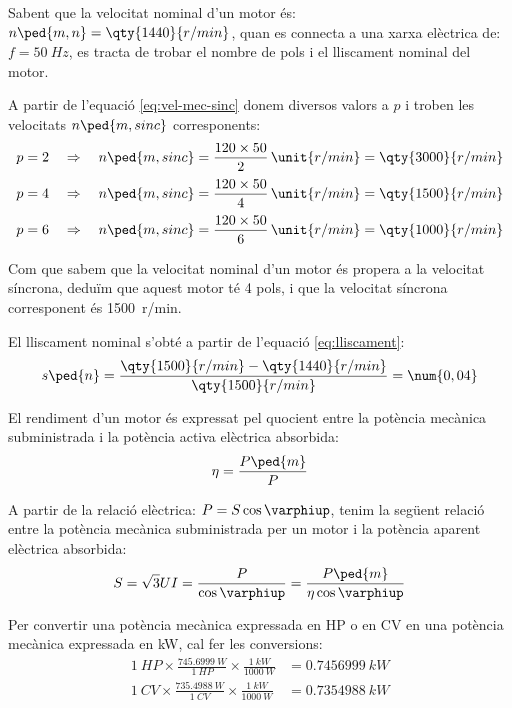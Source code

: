	
\begin{exemple}[\MotorNombrePols{}]
	\addcontentsxms{\MotorNombrePols}
    Sabent que la velocitat nominal d'un motor és: $n\ped{m,n} = \qty{1440}{r/min}$, quan es connecta a una xarxa elèctrica de: $f = \qty{50}{Hz}$,  es tracta de trobar el nombre de pols i el lliscament nominal del motor.

    A partir de l'equació \eqref{eq:vel-mec-sinc} donem diversos valors a $p$ i troben les velocitats $n\ped{m,sinc}$ corresponents:
    \begin{align*}
      p = 2 \quad  &\Rightarrow \quad n\ped{m,sinc} = \frac{120 \times 50}{2} \, \unit{r/min} = \qty{3000}{r/min}\\[0.5ex]
      p = 4 \quad  &\Rightarrow \quad n\ped{m,sinc} = \frac{120 \times 50}{4} \, \unit{r/min} = \qty{1500}{r/min}\\[0.5ex]
      p = 6 \quad  &\Rightarrow \quad n\ped{m,sinc} = \frac{120 \times 50}{6} \, \unit{r/min} = \qty{1000}{r/min}
    \end{align*}

    Com que sabem que la velocitat nominal d'un motor és propera a la velocitat síncrona, deduïm que aquest motor té 4 pols, i que la velocitat síncrona corresponent és \qty{1500}{r/min}.

    El lliscament nominal s'obté a partir de l'equació \eqref{eq:lliscament}:
    \[
      s\ped{n} = \frac{\qty{1500}{r/min} - \qty{1440}{r/min}}{\qty{1500}{r/min}} = \num{0,04}
    \]
\end{exemple}

El rendiment d'un motor és expressat pel quocient entre la potència mecànica subministrada i la potència activa elèctrica absorbida:
\begin{equation}\index{rendiment}\index{potència!mecànica}
    \eta = \frac{P\ped{m}}{P}
\end{equation}

A partir de la relació elèctrica: $P = S \cos\varphiup$, tenim la següent relació entre la potència mecànica subministrada per un motor i la potència aparent elèctrica absorbida:
\begin{equation}
    S = \sqrt{3} U I = \frac{P}{\cos\varphiup} = \frac{P\ped{m}}{\eta \cos\varphiup}\label{eq:mot-S-Pm}
\end{equation}

Per  convertir una potència mecànica expressada en HP o en CV en una  potència mecànica expressada en kW, cal  fer les conversions:
\begin{subequations}
\begin{align}
  \qty{1}{HP} \times \frac{\qty{745,6999}{W}}{\qty{1}{HP}} \times \frac{\qty{1}{kW}}{\qty{1000}{W}} &= \qty{0,7456999}{kW} \\[1ex]
  \qty{1}{CV} \times \frac{\qty{735,4988}{W}}{\qty{1}{CV}} \times \frac{\qty{1}{kW}}{\qty{1000}{W}} &= \qty{0,7354988}{kW}
\end{align}
\end{subequations}

